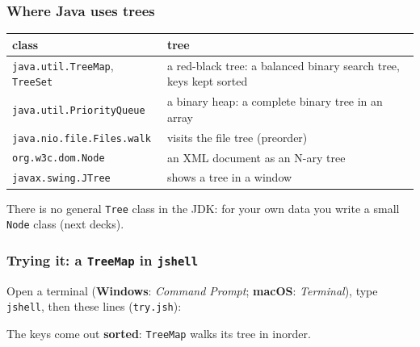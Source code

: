 \documentclass[aspectratio=169,10pt,compress]{beamer}
\newcommand{\win}{\textbf{Windows}}
\newcommand{\mac}{\textbf{macOS}}
\begin{document}
\begin{frame}[t,fragile] \frametitle{Where Java uses trees}
  \begin{center}\small
  \begin{tabular}{lL{0.5\textwidth}}
    \toprule
    \textbf{class}                        & \textbf{tree} \\
    \midrule
    \texttt{java.util.TreeMap}, \texttt{TreeSet} & a red-black tree: a balanced binary search tree, keys kept sorted \\
    \texttt{java.util.PriorityQueue}      & a binary heap: a complete binary tree in an array \\
    \texttt{java.nio.file.Files.walk}     & visits the file tree (preorder) \\
    \texttt{org.w3c.dom.Node}             & an XML document as an N-ary tree \\
    \texttt{javax.swing.JTree}            & shows a tree in a window \\
    \bottomrule
  \end{tabular}
  \end{center}
  \vspace{0.3em}
  \small There is no general \texttt{Tree} class in the JDK: for your own data you write a small \texttt{Node} class (next decks).
\end{frame}




\begin{frame}[t,fragile] \frametitle{Trying it: a \texttt{TreeMap} in \texttt{jshell}}
  \small Open a terminal (\win: \emph{Command Prompt}; \mac: \emph{Terminal}), type \texttt{jshell}, then these lines (\texttt{try.jsh}):


  \vspace{0.1em}
  \small
  The keys come out \textbf{sorted}: \texttt{TreeMap} walks its tree in inorder.
\end{frame}

\end{document}
